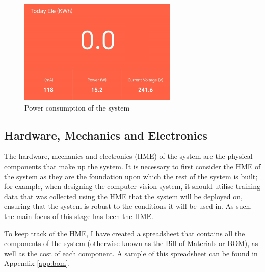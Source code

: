 \begin{figure}[t]
\begin{minipage}[t]{0.22\textwidth}
      \centering
      \includegraphics[width=\textwidth,height=5cm, keepaspectratio]{imgs/powermeter.png}
      \caption{Power consumption of the system}
      \label{fig:powermeter}
  \end{minipage}
\end{figure}

\subsection{Hardware, Mechanics and Electronics}
The hardware, mechanics and electronics (HME) of the system are the physical components that make up the system.
It is necessary to first consider the HME of the system as they are the foundation upon which the rest of the system is built;
for example, when designing the computer vision system, it should utilise training data that was collected using the HME 
that the system will be deployed on, ensuring that the system is robust to the conditions it will be used in. As such,
the main focus of this stage has been the HME.

To keep track of the HME, I have created a spreadsheet that contains all the components of the system (otherwise known as the Bill of Materials or BOM),
as well as the cost of each component. A sample of this spreadsheet can be found in Appendix \ref*{app:bom}.
